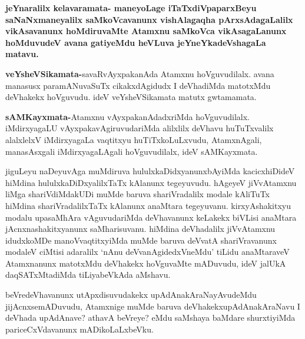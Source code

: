 \begin{artha}
\textbf{jeYnaralilx kelavaramata- maneyoLage iTaTxdiVpaparxBeyu saNaNxmaneyalilx saMkoVcavanunx vishAlagaqha pArxsAdagaLalilx vikAsavanunx hoMdiruvaMte Atamxnu saMkoVca vikAsagaLanunx hoMduvudeV avana gatiyeMdu heVLuva jeYneYkadeVshagaLa matavu.}
\end{artha}

\begin{artha}
\textbf{veYsheVSikamata-}savaRvAyxpakanAda Atamxnu hoVguvudilalx. avana manasusx paramANuvaSuTx cikakxdAgidudx I deVhadiMda matotxMdu deVhakekx hoVguvudu. ideV veYsheVSikamata matutx gwtamamata.
\end{artha}

\begin{artha}
\textbf{sAMKayxmata-}Atamxnu vAyxpakanAdadxriMda hoVguvudilalx. iMdirxyagaLU vAyxpakavAgiruvudariMda alilxlilx deVhavu huTuTxvalilx alalxlelxV iMdirxyagaLa vaqtitxyu huTiTxkoLuLxvudu, AtamxnAgali, manasAsxgali iMdirxyagaLAgali hoVguvudilalx, ideV sAMKayxmata.
\end{artha}


\begin{artha}
jiguLeyu naDeyuvAga muMdiruva hululxkaDidxyanunx\break bAyiMda kacicxhiDideV hiMdina hululxkaDiDxyalilxTaTx kAlanunx tegeyuvudu. hAgeyeV jiVvAtamxnu liMga shariVdiMdakUDi muMde baruva shariVradalilx modale kAliTuTx hiMdina shariVradalilxTaTx kAlanunx anaMtara tegeyuvanu. kirxyAshakitxyu modalu upasaMhAra vAguvudariMda deVhavanunx keLakekx biVLisi anaMtara jAcnxnashakitxyanunx saMharisuvanu. hiMdina deVhadalilx jiVvAtamxnu idudxkoMDe manoVvaqtitxyiMda muMde baruva deVvatA shariVravanunx modaleV ciMtisi adaralilx  `nAnu deVvanAgidedxVneMdu' tiLidu anaMtaraveV Atamxnanunx matotxMdu deVhakekx hoVguvaMte mADuvudu, ideV jalUkA daqSATxMtadiMda tiLiyabeVkAda aMshavu.
\end{artha}


\begin{artha}
beVredeVhavanunx utApxdisuvudakekx upAdAnakAraNayAvu\-\break deMdu jijAcnxsemADuvudu, Atamxnige muMde baruva deVhakekx\break upAdAnakAraNavu I deVhada upAdAnave? athavA beVreye? eMdu saMshaya baMdare shurxtiyiMda pariceCxVdavanunx mADikoLaLxbeVku.
\end{artha}

